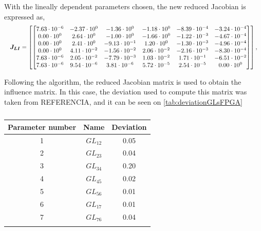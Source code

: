 With the lineally dependent parameters chosen, the new reduced Jacobian is expressed as,
\begin{equation}
    \resizebox{\textwidth}{!}{$\displaystyle
    \boldsymbol{J_{LI}} = \left[\begin{bmatrix}
      7.63 \cdot 10^{-6} & -2.37 \cdot 10^{0} & -1.36 \cdot 10^{0} & -1.18 \cdot 10^{0} & -8.39 \cdot 10^{-4} & -3.24 \cdot 10^{-4} \\
      0.00 \cdot 10^{0} & 2.64 \cdot 10^{0} & -1.00 \cdot 10^{0} & -1.66 \cdot 10^{0} & -1.22 \cdot 10^{-3} & -4.67 \cdot 10^{-4} \\
      0.00 \cdot 10^{0} & 2.41 \cdot 10^{0} & -9.13 \cdot 10^{-1} & 1.20 \cdot 10^{0} & -1.30 \cdot 10^{-3} & -4.96 \cdot 10^{-4} \\
      0.00 \cdot 10^{0} & 4.11 \cdot 10^{-2} & -1.56 \cdot 10^{-2} & 2.06 \cdot 10^{-2} & -2.16 \cdot 10^{-3} & -8.30 \cdot 10^{-4} \\
      7.63 \cdot 10^{-6} & 2.05 \cdot 10^{-2} & -7.79 \cdot 10^{-3} & 1.03 \cdot 10^{-2} & 1.71 \cdot 10^{-1} & -6.51 \cdot 10^{-2} \\
      7.63 \cdot 10^{-6} & 9.54 \cdot 10^{-6} & 3.81 \cdot 10^{-6} & 5.72 \cdot 10^{-5} & 2.54 \cdot 10^{-5} & 0.00 \cdot 10^{0}
    \end{bmatrix}\right],
    $}
    \label{eq:jacobianredFPGA}
    \end{equation}
    
    
Following the algorithm, the reduced Jacobian matrix is used to obtain the influence matrix. In this case, the deviation used to compute this matrix was taken from REFERENCIA, and it can be seen on \autoref{tab:deviationGLsFPGA}

\begin{table}[H]
\centering
\caption{}
\label{tab:deviationGLsFPGA}

\begin{tabular}{c c c}
\toprule
\multicolumn{1}{c}{\textbf{Parameter number}} & \multicolumn{1}{c}{\textbf{Name}} & \multicolumn{1}{c}{\textbf{Deviation}} \\ \midrule
1 & $GL_{12}$ & 0.05 \\
2 & $GL_{23}$ & 0.04 \\
3 & $GL_{34}$ & 0.20 \\
4 & $GL_{45}$ & 0.02 \\
5 & $GL_{56}$ & 0.01 \\
6 & $GL_{17}$ & 0.01 \\
7 & $GL_{76}$ & 0.04 \\\\ \bottomrule  
\end{tabular}
\end{table}

